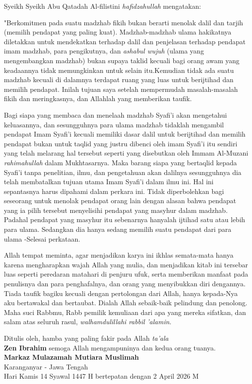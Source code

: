 Syeikh Syeikh Abu Qatadah Al-filistini \textit{hafidzahullah} mengatakan: 

"Berkomitmen pada suatu madzhab fikih bukan berarti menolak dalil dan tarjih (memilih pendapat yang paling kuat). Madzhab-madzhab ulama hakikatnya diletakkan untuk mendekatkan terhadap dalil dan penjelasan terhadap pendapat imam madzhab, para pengikutnya, dan \textit{ashabul wujuh } (ulama yang mengembangkan madzhab) bukan supaya taklid kecuali bagi orang awam yang keadaannya tidak memungkinkan untuk selain itu.Kemudian tidak ada suatu madzhab kecuali di dalamnya terdapat ruang yang luas untuk berijtihad dan memilih pendapat. Inilah tujuan saya setelah mempermudah masalah-masalah fikih dan meringkasnya, dan Allahlah yang memberikan taufik.

Bagi siapa yang membaca dan menelaah madzhab Syafi’i akan mengetahui keluasannya, dan sesungguhnya para ulama madzhab tidaklah mengambil pendapat Imam Syafi’i kecuali memiliki dasar dalil untuk berijtihad dan memilih pendapat bukan untuk taqlid yang justru dibenci oleh imam Syafi’i itu sendiri yang telah melarang hal tersebut seperti yang disebutkan oleh Immam  Al-Muzani \textit{rahimahullah} dalam Mukhtasarnya. Maka barang siapa yang bertaqlid kepada Syafi’i tanpa penelitian, ilmu, dan pengetahuan akan dalilnya sesungguhnya dia telah membatalkan tujuan utama Imam Syafi’i dalam ilmu ini. Hal ini sepantasnya harus dipahami dalam perkara ini. Tidak diperbolehkan bagi seseorang untuk menolak pendapat orang lain dengan alasan bahwa pendapat yang ia pilih tersebut menyelisihi pendapat yang masyhur dalam madzhab. Padahal pendapat yang masyhur itu sebenarnya hanyalah ijtihad satu atau lebih para ulama. Sedangkan dia hanya sedang memilih suatu pendapat dari para ulama -Selesai perkataan.

Allah tempat meminta, agar menjadikan karya ini ikhlas semata-mata hanya karena mengharapkan wajah Allah yang mulia, dan menjadikan kitab ini tersebar luas seperti peredaran matahari di penjuru ufuk, serta memberikan manfaat pada penulisnya dan para penghafalnya, dan orang yang menyibukkan diri dengannya. Tiada taufik bagiku kecuali dengan pertolongan dari Allah, hanya kepada-Nya aku bertawakal dan bertaubat. Dialah Allah sebaik-baik pelindung dan penolong. Maha suci Rabbmu, Rabb pemilik kemuliaan dari apa yang mereka sifatkan, dan salam atas seluruh rasul, \textit{walhamdulillahi rabbil 'alamin}.

\vspace{1cm} %

\begin{flushleft}
Ditulis oleh, hamba yang paling fakir pada Allah \textit{ta'ala}\\
\textbf{Zen Ibrahim} semoga Allah mengampuninya dan kedua orang tuanya.\\
\textbf{Markaz Mulazamah Mutiara Muslimah}\\
Karanganyar - Jawa Tengah\\
Hari Kamis 14 Syawal 1447 H bertepatan dengan 2 April 2026 M
\end{flushleft}